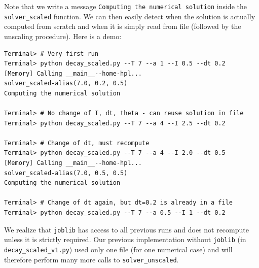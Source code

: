 \documentclass[graybox,envcountchap,sectrefs,final]{svmonodo}
\begin{document}
Note that we write a message \texttt{Computing the numerical solution} inside
the \Verb!solver_scaled! function. We can then easily detect when
the solution is actually computed from scratch
and when it is simply read from file (followed by the unscaling procedure).
Here is a demo:

\begin{Verbatim}[frame=lines,label=\fbox{{\tiny Terminal}},framesep=2.5mm,framerule=0.7pt,fontsize=\fontsize{9pt}{9pt}]
Terminal> # Very first run
Terminal> python decay_scaled.py --T 7 --a 1 --I 0.5 --dt 0.2
[Memory] Calling __main__--home-hpl...
solver_scaled-alias(7.0, 0.2, 0.5)
Computing the numerical solution

Terminal> # No change of T, dt, theta - can reuse solution in file
Terminal> python decay_scaled.py --T 7 --a 4 --I 2.5 --dt 0.2

Terminal> # Change of dt, must recompute
Terminal> python decay_scaled.py --T 7 --a 4 --I 2.0 --dt 0.5
[Memory] Calling __main__--home-hpl...
solver_scaled-alias(7.0, 0.5, 0.5)
Computing the numerical solution

Terminal> # Change of dt again, but dt=0.2 is already in a file
Terminal> python decay_scaled.py --T 7 --a 0.5 --I 1 --dt 0.2
\end{Verbatim}

We realize that \texttt{joblib} has access to all previous runs and does not
recompute unless it is strictly required. Our previous implementation
without \texttt{joblib} (in \Verb!decay_scaled_v1.py!)
used only one file (for one numerical case)
and will therefore perform many more calls to
\Verb!solver_unscaled!.
\end{document}
